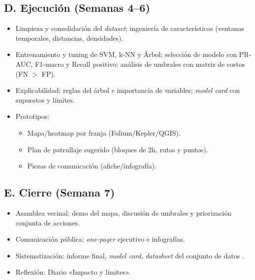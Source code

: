 \documentclass[a4,11pt]{aleph-notas}
\begin{document}
\subsection*{D. Ejecución (Semanas 4--6)}
\begin{itemize}
    \item Limpieza y consolidación del \emph{dataset}; ingeniería de características (ventanas temporales, distancias, densidades).
    \item Entrenamiento y {tuning} de SVM, k-NN y Árbol; selección de modelo con {PR-AUC}, {F1-macro} y {Recall positivo}; análisis de {umbrales} con matriz de costos (FN \(>\) FP).
    \item Explicabilidad: reglas del árbol e importancia de variables; \emph{model card} con supuestos y límites.
    \item Prototipos:
    \begin{itemize}
        \item Mapa/heatmap por franja (Folium/Kepler/QGIS).
        \item Plan de patrullaje sugerido (bloques de 2h, rutas y puntos).
        \item Piezas de comunicación (afiche/infografía).
    \end{itemize}
\end{itemize}

\subsection*{E. Cierre (Semana 7)}
\begin{itemize}
    \item {Asamblea vecinal:} demo del mapa, discusión de umbrales y priorización conjunta de acciones.
    \item Comunicación pública: \emph{one-pager} ejecutivo e infografías.
    \item Sistematización: informe final, \emph{model card}, \emph{datasheet} del conjunto de datos .
    \item {Reflexión:} Diario «Impacto y límites».
\end{itemize}
\end{document}
